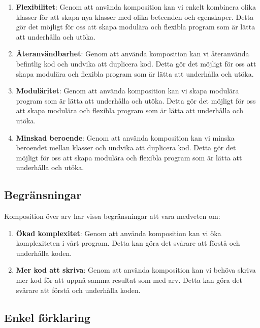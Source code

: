 \begin{enumerate}
\def\labelenumi{\arabic{enumi}.}
\item
  \textbf{Flexibilitet}: Genom att använda komposition kan vi enkelt
  kombinera olika klasser för att skapa nya klasser med olika beteenden
  och egenskaper. Detta gör det möjligt för oss att skapa modulära och
  flexibla program som är lätta att underhålla och utöka.
\item
  \textbf{Återanvändbarhet}: Genom att använda komposition kan vi
  återanvända befintlig kod och undvika att duplicera kod. Detta gör det
  möjligt för oss att skapa modulära och flexibla program som är lätta
  att underhålla och utöka.
\item
  \textbf{Moduläritet}: Genom att använda komposition kan vi skapa
  modulära program som är lätta att underhålla och utöka. Detta gör det
  möjligt för oss att skapa modulära och flexibla program som är lätta
  att underhålla och utöka.
\item
  \textbf{Minskad beroende}: Genom att använda komposition kan vi minska
  beroendet mellan klasser och undvika att duplicera kod. Detta gör det
  möjligt för oss att skapa modulära och flexibla program som är lätta
  att underhålla och utöka.
\end{enumerate}

\hypertarget{begruxe4nsningar}{%
\subsection{Begränsningar}\label{begruxe4nsningar}}

Komposition över arv har vissa begränsningar att vara medveten om:

\begin{enumerate}
\def\labelenumi{\arabic{enumi}.}
\item
  \textbf{Ökad komplexitet}: Genom att använda komposition kan vi öka
  komplexiteten i vårt program. Detta kan göra det svårare att förstå
  och underhålla koden.
\item
  \textbf{Mer kod att skriva}: Genom att använda komposition kan vi
  behöva skriva mer kod för att uppnå samma resultat som med arv. Detta
  kan göra det svårare att förstå och underhålla koden.
\end{enumerate}

\hypertarget{enkel-fuxf6rklaring}{%
\subsection{Enkel förklaring}\label{enkel-fuxf6rklaring}}

